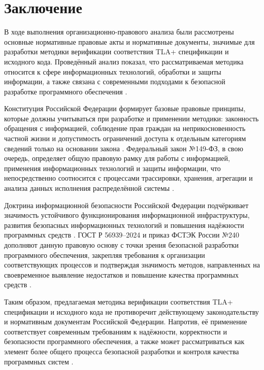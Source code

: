 \section{Заключение}

В ходе выполнения организационно-правового анализа были рассмотрены
основные нормативные правовые акты и нормативные документы, значимые для
разработки методики верификации соответствия TLA+ спецификации и исходного
кода. Проведённый анализ показал, что рассматриваемая методика относится к
сфере информационных технологий, обработки и защиты информации, а также
связана с современными подходами к безопасной разработке программного
обеспечения \cite{constitution_rf,fz149_info,doctrine_ib_rf,gost_56939_2024,fstek_240_2023}.

Конституция Российской Федерации формирует базовые правовые принципы,
которые должны учитываться при разработке и применении методики:
законность обращения с информацией, соблюдение прав граждан на
неприкосновенность частной жизни и допустимость ограничений доступа к
отдельным категориям сведений только на основании закона
\cite{constitution_rf}. Федеральный закон №149-ФЗ, в свою очередь,
определяет общую правовую рамку для работы с информацией, применения
информационных технологий и защиты информации, что непосредственно
соотносится с процессами трассировки, хранения, агрегации и анализа данных
исполнения распределённой системы \cite{fz149_info}.

Доктрина информационной безопасности Российской Федерации подчёркивает
значимость устойчивого функционирования информационной инфраструктуры,
развития безопасных информационных технологий и повышения надёжности
программных средств \cite{doctrine_ib_rf}. ГОСТ Р 56939--2024 и приказ
ФСТЭК России №240 дополняют данную правовую основу с точки зрения
безопасной разработки программного обеспечения, закрепляя требования к
организации соответствующих процессов и подтверждая значимость методов,
направленных на своевременное выявление недостатков и повышение качества
программных средств \cite{gost_56939_2024,fstek_240_2023}.

Таким образом, предлагаемая методика верификации соответствия TLA+
спецификации и исходного кода не противоречит действующему
законодательству и нормативным документам Российской Федерации. Напротив,
её применение соответствует современным требованиям к надёжности,
корректности и безопасности программного обеспечения, а также может
рассматриваться как элемент более общего процесса безопасной разработки и
контроля качества программных систем
\cite{constitution_rf,fz149_info,doctrine_ib_rf,gost_56939_2024,fstek_240_2023}.
